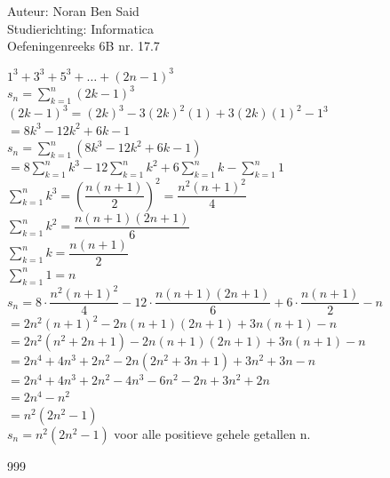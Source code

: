 \documentclass[a4paper]{article}
\begin{document}
  
\noindent \large Auteur: Noran Ben Said \\
\noindent \large Studierichting: Informatica\\
\noindent \large Oefeningenreeks 6B nr. 17.7\\

\medskip

\normalsize


$1^3 + 3^3 + 5^3 + \dots + (2n-1)^3$\\

$s_n = \displaystyle\sum_{k=1}^{n} (2k-1)^3$\\

$(2k-1)^3 = (2k)^3 - 3(2k)^2(1) + 3(2k)(1)^2 - 1^3$\\

$= 8k^3 - 12k^2 + 6k - 1$\\

$s_n = \displaystyle\sum_{k=1}^{n} (8k^3 - 12k^2 + 6k - 1)$\\

$= 8\displaystyle\sum_{k=1}^{n} k^3 - 12\displaystyle\sum_{k=1}^{n} k^2 + 6\displaystyle\sum_{k=1}^{n} k - \displaystyle\sum_{k=1}^{n} 1$\\

$\displaystyle\sum_{k=1}^{n} k^3 = \left(\dfrac{n(n+1)}{2}\right)^2 = \dfrac{n^2(n+1)^2}{4}$\\

$\displaystyle\sum_{k=1}^{n} k^2 = \dfrac{n(n+1)(2n+1)}{6}$\\

$\displaystyle\sum_{k=1}^{n} k = \dfrac{n(n+1)}{2}$\\

$\displaystyle\sum_{k=1}^{n} 1 = n$\\


$s_n = 8 \cdot \dfrac{n^2(n+1)^2}{4} - 12 \cdot \dfrac{n(n+1)(2n+1)}{6} + 6 \cdot \dfrac{n(n+1)}{2} - n$\\

$= 2n^2(n+1)^2 - 2n(n+1)(2n+1) + 3n(n+1) - n$\\


$= 2n^2(n^2 + 2n + 1) - 2n(n+1)(2n+1) + 3n(n+1) - n$\\

$= 2n^4 + 4n^3 + 2n^2 - 2n(2n^2 + 3n + 1) + 3n^2 + 3n - n$\\

$= 2n^4 + 4n^3 + 2n^2 - 4n^3 - 6n^2 - 2n + 3n^2 + 2n$\\

$= 2n^4 - n^2$\\

$= n^2(2n^2 - 1)$\\


$s_n = n^2(2n^2 - 1)$ voor alle positieve gehele getallen
n.\\

\begin{thebibliography}{999}
\end{thebibliography}
\end{document}
